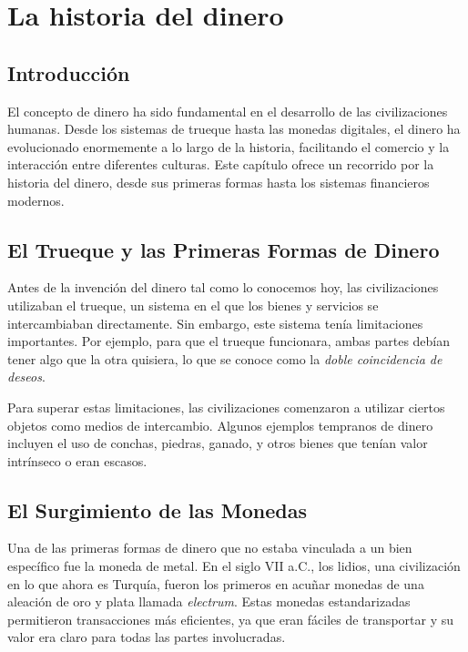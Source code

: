 \chapter{La historia del dinero}

\section{Introducción}

	El concepto de dinero ha sido fundamental en el desarrollo de las civilizaciones humanas. Desde los sistemas de trueque hasta las monedas digitales, el dinero ha evolucionado enormemente a lo largo de la historia, facilitando el comercio y la interacción entre diferentes culturas. Este capítulo ofrece un recorrido por la historia del dinero, desde sus primeras formas hasta los sistemas financieros modernos.

	\section{El Trueque y las Primeras Formas de Dinero}

	Antes de la invención del dinero tal como lo conocemos hoy, las civilizaciones utilizaban el trueque, un sistema en el que los bienes y servicios se intercambiaban directamente. Sin embargo, este sistema tenía limitaciones importantes. Por ejemplo, para que el trueque funcionara, ambas partes debían tener algo que la otra quisiera, lo que se conoce como la \textit{doble coincidencia de deseos}.

	Para superar estas limitaciones, las civilizaciones comenzaron a utilizar ciertos objetos como medios de intercambio. Algunos ejemplos tempranos de dinero incluyen el uso de conchas, piedras, ganado, y otros bienes que tenían valor intrínseco o eran escasos.

	\section{El Surgimiento de las Monedas}

	Una de las primeras formas de dinero que no estaba vinculada a un bien específico fue la moneda de metal. En el siglo VII a.C., los lidios, una civilización en lo que ahora es Turquía, fueron los primeros en acuñar monedas de una aleación de oro y plata llamada \textit{electrum}. Estas monedas estandarizadas permitieron transacciones más eficientes, ya que eran fáciles de transportar y su valor era claro para todas las partes involucradas.

